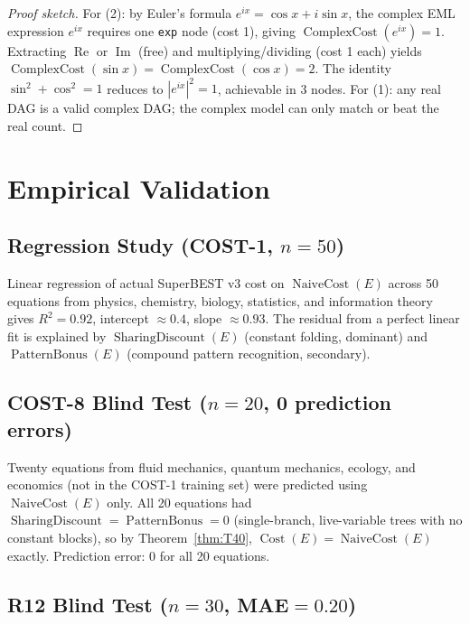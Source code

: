 \documentclass[12pt,a4paper]{article}
\theoremstyle{definition}
\newcommand{\Cost}{\operatorname{Cost}}
\newcommand{\NC}{\operatorname{NaiveCost}}
\newcommand{\SD}{\operatorname{SharingDiscount}}
\newcommand{\PB}{\operatorname{PatternBonus}}
\newcommand{\CC}{\operatorname{ComplexCost}}
\begin{document}
\begin{proof}[Proof sketch]
For (2): by Euler's formula $e^{ix} = \cos x + i\sin x$, the complex EML
expression $e^{ix}$ requires one \texttt{exp} node (cost 1), giving
$\CC(e^{ix})=1$.  Extracting $\operatorname{Re}$ or $\operatorname{Im}$ (free)
and multiplying/dividing (cost 1 each) yields $\CC(\sin x)=\CC(\cos x)=2$.
The identity $\sin^2+\cos^2=1$ reduces to $|e^{ix}|^2=1$, achievable in 3
nodes.  For (1): any real DAG is a valid complex DAG; the complex model can
only match or beat the real count.
\end{proof}

\section{Empirical Validation}
\label{sec:empirical}

\subsection{Regression Study (COST-1, $n=50$)}

Linear regression of actual SuperBEST v3 cost on $\NC(E)$ across 50 equations
from physics, chemistry, biology, statistics, and information theory gives
$R^2 = 0.92$, intercept $\approx 0.4$, slope $\approx 0.93$.  The residual
from a perfect linear fit is explained by $\SD(E)$ (constant folding,
dominant) and $\PB(E)$ (compound pattern recognition, secondary).

\subsection{COST-8 Blind Test ($n=20$, 0 prediction errors)}

Twenty equations from fluid mechanics, quantum mechanics, ecology, and
economics (not in the COST-1 training set) were predicted using $\NC(E)$ only.
All 20 equations had $\SD=\PB=0$ (single-branch, live-variable trees with no
constant blocks), so by Theorem~\ref{thm:T40}, $\Cost(E)=\NC(E)$ exactly.
Prediction error: 0 for all 20 equations.

\subsection{R12 Blind Test ($n=30$, MAE$=0.20$)}
\end{document}
